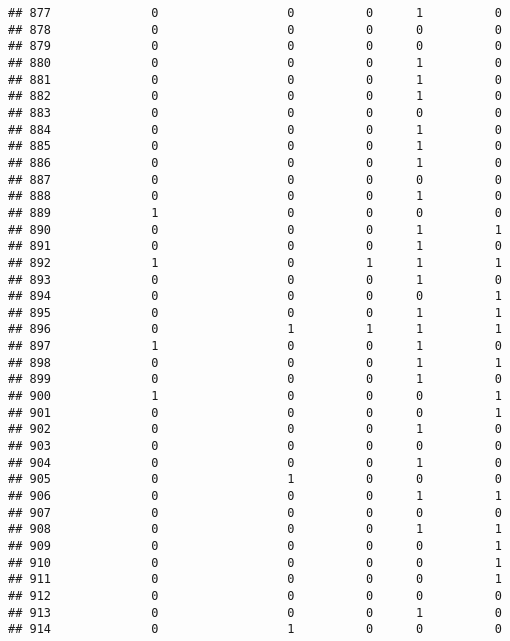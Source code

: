 \documentclass[
]{article}
\begin{document}
\begin{verbatim}
## 877              0                  0          0      1          0
## 878              0                  0          0      0          0
## 879              0                  0          0      0          0
## 880              0                  0          0      1          0
## 881              0                  0          0      1          0
## 882              0                  0          0      1          0
## 883              0                  0          0      0          0
## 884              0                  0          0      1          0
## 885              0                  0          0      1          0
## 886              0                  0          0      1          0
## 887              0                  0          0      0          0
## 888              0                  0          0      1          0
## 889              1                  0          0      0          0
## 890              0                  0          0      1          1
## 891              0                  0          0      1          0
## 892              1                  0          1      1          1
## 893              0                  0          0      1          0
## 894              0                  0          0      0          1
## 895              0                  0          0      1          1
## 896              0                  1          1      1          1
## 897              1                  0          0      1          0
## 898              0                  0          0      1          1
## 899              0                  0          0      1          0
## 900              1                  0          0      0          1
## 901              0                  0          0      0          1
## 902              0                  0          0      1          0
## 903              0                  0          0      0          0
## 904              0                  0          0      1          0
## 905              0                  1          0      0          0
## 906              0                  0          0      1          1
## 907              0                  0          0      0          0
## 908              0                  0          0      1          1
## 909              0                  0          0      0          1
## 910              0                  0          0      0          1
## 911              0                  0          0      0          1
## 912              0                  0          0      0          0
## 913              0                  0          0      1          0
## 914              0                  1          0      0          0

\end{verbatim}
\end{document}
